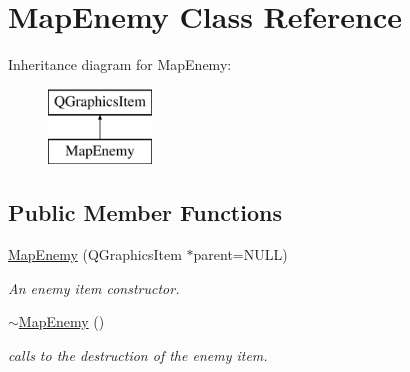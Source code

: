 \hypertarget{class_map_enemy}{\section{Map\-Enemy Class Reference}
\label{class_map_enemy}
}
Inheritance diagram for Map\-Enemy\-:\begin{figure}[H]
\begin{center}
\leavevmode
\includegraphics[height=2.000000cm]{class_map_enemy}
\end{center}
\end{figure}
\subsection*{Public Member Functions}
\begin{DoxyCompactItemize}
\item 
\hyperlink{class_map_enemy_a0ec0658d11120c1618bdd39fae1c8f30}{Map\-Enemy} (Q\-Graphics\-Item $\ast$parent=N\-U\-L\-L)
\begin{DoxyCompactList}\small\item\em An enemy item constructor. \end{DoxyCompactList}\item 
\hypertarget{class_map_enemy_ae67d6517d65f658fb08b66ced225e421}{\hyperlink{class_map_enemy_ae67d6517d65f658fb08b66ced225e421}{$\sim$\-Map\-Enemy} ()}\label{class_map_enemy_ae67d6517d65f658fb08b66ced225e421}

\begin{DoxyCompactList}\small\item\em calls to the destruction of the enemy item. \end{DoxyCompactList}\end{DoxyCompactItemize}
